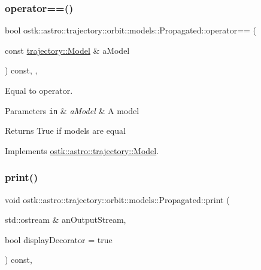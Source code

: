 \subsubsection{\texorpdfstring{operator==()}{operator==()}\hspace{0.1cm}{\footnotesize\ttfamily [2/2]}}
{\footnotesize\ttfamily bool ostk\+::astro\+::trajectory\+::orbit\+::models\+::\+Propagated\+::operator== (\begin{DoxyParamCaption}\item[{const \hyperlink{classostk_1_1astro_1_1trajectory_1_1_model}{trajectory\+::\+Model} \&}]{a\+Model }\end{DoxyParamCaption}) const\hspace{0.3cm}{\ttfamily [override]}, {\ttfamily [protected]}, {\ttfamily [virtual]}}



Equal to operator. 


\begin{DoxyParams}[1]{Parameters}
\mbox{\tt in}  & {\em a\+Model} & A model \\
\hline
\end{DoxyParams}
\begin{DoxyReturn}{Returns}
True if models are equal 
\end{DoxyReturn}


Implements \hyperlink{classostk_1_1astro_1_1trajectory_1_1_model_a874f79846e845859c070ce1b9874fc9c}{ostk\+::astro\+::trajectory\+::\+Model}.

\mbox{\label{classostk_1_1astro_1_1trajectory_1_1orbit_1_1models_1_1_propagated_a2b8aa6ff5511dbe92e6a3e7f4dd6880b}} 
\subsubsection{\texorpdfstring{print()}{print()}}
{\footnotesize\ttfamily void ostk\+::astro\+::trajectory\+::orbit\+::models\+::\+Propagated\+::print (\begin{DoxyParamCaption}\item[{std\+::ostream \&}]{an\+Output\+Stream,  }\item[{bool}]{display\+Decorator = {\ttfamily true} }\end{DoxyParamCaption}) const\hspace{0.3cm}{\ttfamily [override]}, {\ttfamily [virtual]}}



